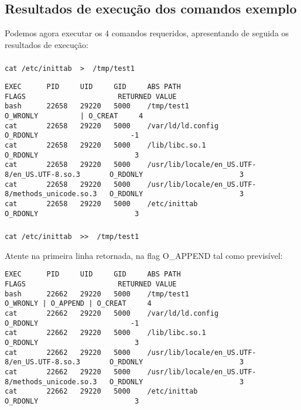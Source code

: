 \documentclass[a4paper]{article}
\begin{document}
\subsection{Resultados de execução dos comandos exemplo}
Podemos agora executar os 4 comandos requeridos, apresentando de seguida os resultados de execução:
\subsubsection{}

 \begin{lstlisting}[style=command]
 cat /etc/inittab  >  /tmp/test1
   \end{lstlisting}
   
\par 
\begin{lstlisting}[style=esc]
EXEC      PID     UID     GID     ABS PATH                                          FLAGS                      RETURNED VALUE
bash      22658   29220   5000    /tmp/test1                                         O_WRONLY          | O_CREAT     4
cat       22658   29220   5000    /var/ld/ld.config                                  O_RDONLY                      -1
cat       22658   29220   5000    /lib/libc.so.1                                     O_RDONLY                       3
cat       22658   29220   5000    /usr/lib/locale/en_US.UTF-8/en_US.UTF-8.so.3       O_RDONLY                       3
cat       22658   29220   5000    /usr/lib/locale/en_US.UTF-8/methods_unicode.so.3   O_RDONLY                       3
cat       22658   29220   5000    /etc/inittab                                       O_RDONLY                       3
 \end{lstlisting}

\subsubsection{}

 \begin{lstlisting}[style=command]
 cat /etc/inittab  >>  /tmp/test1
   \end{lstlisting}
   Atente na primeira linha retornada, na flag O\_APPEND tal como previsível:
\par 
\begin{lstlisting}[style=esc]
EXEC      PID     UID     GID     ABS PATH                                          FLAGS                      RETURNED VALUE
bash      22662   29220   5000    /tmp/test1                                         O_WRONLY | O_APPEND | O_CREAT     4
cat       22662   29220   5000    /var/ld/ld.config                                  O_RDONLY                      -1
cat       22662   29220   5000    /lib/libc.so.1                                     O_RDONLY                       3
cat       22662   29220   5000    /usr/lib/locale/en_US.UTF-8/en_US.UTF-8.so.3       O_RDONLY                       3
cat       22662   29220   5000    /usr/lib/locale/en_US.UTF-8/methods_unicode.so.3   O_RDONLY                       3
cat       22662   29220   5000    /etc/inittab                                       O_RDONLY                       3
 \end{lstlisting}
 
\end{document}

